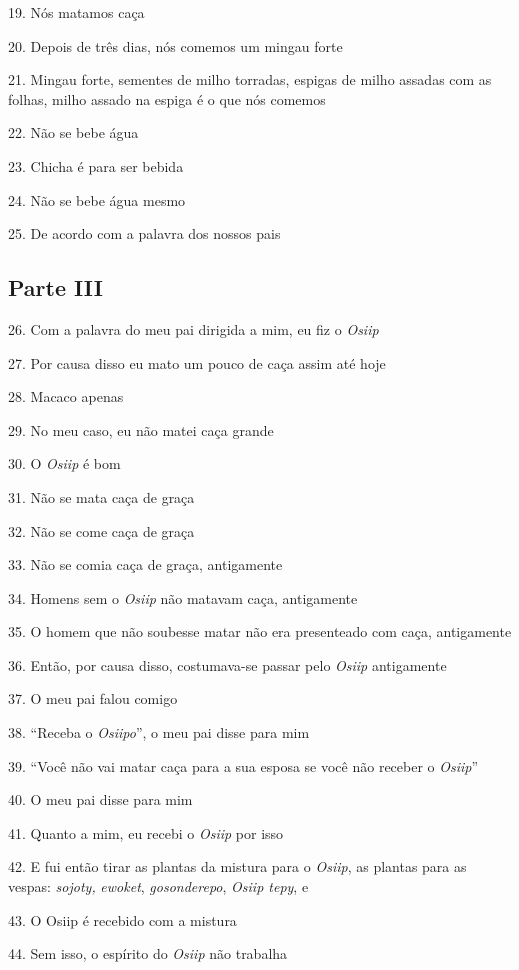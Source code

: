 19. Nós matamos caça

20. Depois de três dias, nós comemos um mingau forte

21. Mingau forte, sementes de milho torradas, espigas de milho assadas
com as folhas, milho assado na espiga é o que nós comemos

22. Não se bebe água

23. Chicha é para ser bebida

24. Não se bebe água mesmo

25. De acordo com a palavra dos nossos pais

\subsection{Parte III}

26. Com a palavra do meu pai dirigida a mim, eu fiz o \emph{Osiip}

27. Por causa disso eu mato um pouco de caça assim até hoje

28. Macaco apenas

29. No meu caso, eu não matei caça grande

30. O \emph{Osiip} é bom

31. Não se mata caça de graça

32. Não se come caça de graça

33. Não se comia caça de graça, antigamente

34. Homens sem o \emph{Osiip} não matavam caça, antigamente

35. O homem que não soubesse matar não era presenteado com caça,
antigamente

36. Então, por causa disso, costumava-se passar pelo \emph{Osiip}
antigamente

37. O meu pai falou comigo

38. ``Receba o \emph{Osiipo}'', o meu pai disse para mim

39. ``Você não vai matar caça para a sua esposa se você não receber o
\emph{Osiip}''

40. O meu pai disse para mim

41. Quanto a mim, eu recebi o \emph{Osiip} por isso

42. E fui então tirar as plantas da mistura para o \emph{Osiip}, as
plantas para as vespas: \emph{sojoty,} \emph{ewoket},
\emph{gosonderepo}, \emph{Osiip tepy}, e

43. O Osiip é recebido com a mistura

44. Sem isso, o espírito do \emph{Osiip} não trabalha

